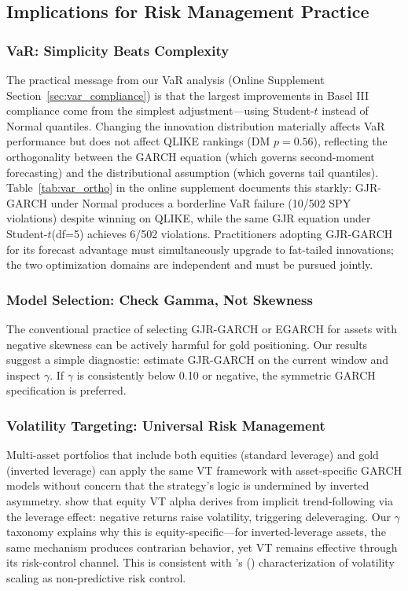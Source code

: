 \subsection{Implications for Risk Management Practice}

\subsubsection{VaR: Simplicity Beats Complexity}

The practical message from our VaR analysis (Online Supplement Section~\ref{sec:var_compliance}) is that the largest improvements in Basel III compliance come from the simplest adjustment---using Student-$t$ instead of Normal quantiles. Changing the innovation distribution materially affects VaR performance but does not affect QLIKE rankings (DM $p = 0.56$), reflecting the orthogonality between the GARCH equation (which governs second-moment forecasting) and the distributional assumption (which governs tail quantiles). Table~\ref{tab:var_ortho} in the online supplement documents this starkly: GJR-GARCH under Normal produces a borderline VaR failure (10/502 SPY violations) despite winning on QLIKE, while the same GJR equation under Student-$t$(df=5) achieves 6/502 violations. Practitioners adopting GJR-GARCH for its forecast advantage must simultaneously upgrade to fat-tailed innovations; the two optimization domains are independent and must be pursued jointly.

\subsubsection{Model Selection: Check Gamma, Not Skewness}

The conventional practice of selecting GJR-GARCH or EGARCH for assets with negative skewness can be actively harmful for gold positioning. Our results suggest a simple diagnostic: estimate GJR-GARCH on the current window and inspect $\gamma$. If $\gamma$ is consistently below 0.10 or negative, the symmetric GARCH specification is preferred.

\subsubsection{Volatility Targeting: Universal Risk Management}

Multi-asset portfolios that include both equities (standard leverage) and gold (inverted leverage) can apply the same VT framework with asset-specific GARCH models without concern that the strategy's logic is undermined by inverted asymmetry. \citet{hood2025} show that equity VT alpha derives from implicit trend-following via the leverage effect: negative returns raise volatility, triggering deleveraging. Our $\gamma$ taxonomy explains why this is equity-specific---for inverted-leverage assets, the same mechanism produces contrarian behavior, yet VT remains effective through its risk-control channel. This is consistent with \citeauthor{nelson2025}'s (\citeyear{nelson2025}) characterization of volatility scaling as non-predictive risk control.

